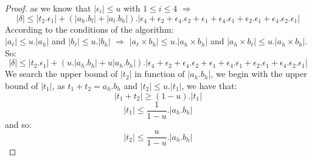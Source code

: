 \begin{proof}
as we know that $\lvert \epsilon_i \rvert \le u$ with $1\le i \le 4$ $\Rightarrow$
$$ \lvert \delta \rvert \le \lvert t_2.\epsilon_1 \rvert + (\lvert a_h.b_l \rvert +\lvert a_l.b_h \rvert ). \lvert \epsilon_4 + \epsilon_2 + \epsilon_4.\epsilon_2 + \epsilon_1 + \epsilon_4.\epsilon_1 + \epsilon_2.\epsilon_1 + \epsilon_4.\epsilon_2.\epsilon_1 \rvert $$
According to the conditions of the algorithm:\\
$\lvert a_{\ell} \rvert \le u. \lvert a_h \rvert$ and $\lvert b_{\ell} \rvert \le u. \lvert b_h \rvert$ $\Rightarrow$
$\lvert a_{\ell} \times b_h \rvert \le u. \lvert a_h \times b_h\rvert$ and $\lvert a_h \times b_{\ell} \rvert \le u. \lvert a_h \times b_h\rvert$.   
So:
$$ \lvert \delta \rvert \le \lvert t_2.\epsilon_1 \rvert + (u. \lvert a_h . b_h\rvert +u \lvert a_h . b_h\rvert ). \lvert \epsilon_4 + \epsilon_2 + \epsilon_4.\epsilon_2 + \epsilon_1 + \epsilon_4.\epsilon_1 + \epsilon_2.\epsilon_1 + \epsilon_4.\epsilon_2.\epsilon_1 \rvert $$
We search the upper bound of $\lvert t_2 \rvert $ in function of $\lvert a_h.b_h \rvert$, we begin with the upper bound of $\lvert t_1 \rvert $, as $ t_1 + t_2 = a_h.b_h$ and $\lvert t_2 \rvert \le u.\lvert t_1 \rvert$, we have that:
$$\lvert t_1 + t_2 \rvert \ge (1 - u) . \lvert t_1 \rvert$$
$$\lvert t_1 \rvert \le \frac{1}{1-u}. \lvert a_h.b_h \rvert$$
and so:
$$\lvert t_2 \rvert \le \frac{u}{1-u}. \lvert a_h.b_h \rvert$$


\end{proof}
